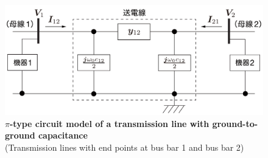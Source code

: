\documentclass[graybox, envcountchap]{svmult}
\begin{document}
\begin{figure}[t]
\centering
\includegraphics[width = .85\linewidth]{figs/line_pix3}
\medskip
\caption{\textbf{$\pi$-type circuit model of a transmission line with ground-to-ground capacitance}\\
\centering(Transmission lines with end points at bus bar 1 and bus bar 2)}
\label{fig:lines} 
\medskip
\end{figure}




\end{document}
